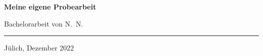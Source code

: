 {\begin{titlepage}
\begin{center}
\Huge \textsf{\bfseries Meine eigene Probearbeit}

\vspace{20pt}
\Large Bachelorarbeit von N.~N.      %
\end{center}

  \rule{\textwidth}{2pt}

\vspace{15pt}
\begin{center}
 Jülich, Dezember 2022
\end{center}

\end{titlepage}
}
\makeatother